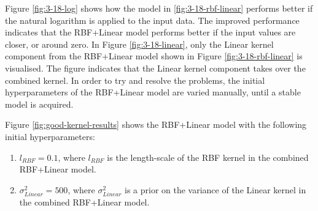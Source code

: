 Figure \ref{fig:3-18-log} shows how the model in \ref{fig:3-18-rbf-linear} performs better if the natural logarithm is applied to the input data.
The improved performance indicates that the RBF+Linear model performs better if the input values are closer, or around zero.
In Figure \ref{fig:3-18-linear}, only the Linear kernel component from the RBF+Linear model shown in Figure \ref{fig:3-18-rbf-linear} is visualised.
The figure indicates that the Linear kernel component takes over the combined kernel.
In order to try and resolve the problems, the initial hyperparameters of the RBF+Linear model are varied manually, until a stable model is acquired.

Figure \ref{fig:good-kernel-results} shows the RBF+Linear model with the following initial hyperparameters:
\begin{enumerate}
    \item $l_{RBF}=0.1$, where $l_{RBF}$ is the length-scale of the RBF kernel in the combined RBF+Linear model.
    \item $\sigma_{Linear}^2=500$, where $\sigma_{Linear}^2$ is a prior on the variance of the Linear kernel in the combined RBF+Linear model.
\end{enumerate}

